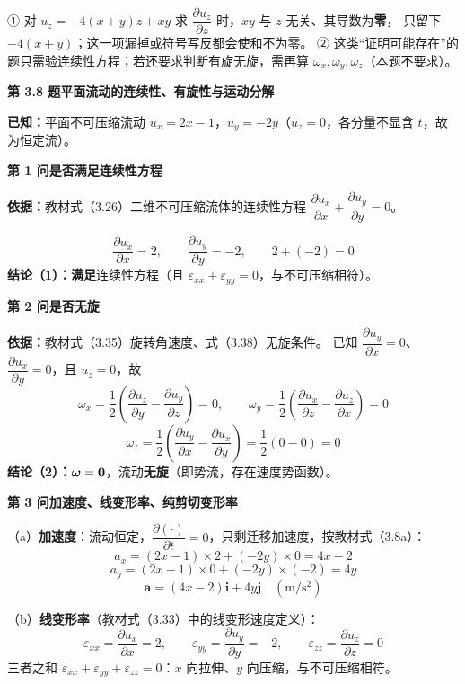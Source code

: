 \begin{yicuo}
① 对 $u_z=-4(x+y)z+xy$ 求 $\dfrac{\partial u_z}{\partial z}$ 时，$xy$ 与 $z$ 无关、其导数为\textbf{零}，
只留下 $-4(x+y)$；这一项漏掉或符号写反都会使和不为零。
② 这类“证明可能存在”的题只需验连续性方程；若还要求判断有旋无旋，需再算
$\omega_x,\omega_y,\omega_z$（本题不要求）。
\end{yicuo}

\noindent\textbf{第 3.8 题\quad 平面流动的连续性、有旋性与运动分解}

\begin{jie}
\textbf{已知：}平面不可压缩流动 $u_x=2x-1$，$u_y=-2y$（$u_z=0$，各分量不显含 $t$，故为恒定流）。

\textbf{第 1 问\quad 是否满足连续性方程}

\textbf{依据：}教材式（3.26）二维不可压缩流体的连续性方程
$\dfrac{\partial u_x}{\partial x}+\dfrac{\partial u_y}{\partial y}=0$。

\[ \frac{\partial u_x}{\partial x}=2,\qquad \frac{\partial u_y}{\partial y}=-2,\qquad 2+(-2)=0 \]
\textbf{结论（1）：}\textbf{满足}连续性方程（且 $\varepsilon_{xx}+\varepsilon_{yy}=0$，与不可压缩相符）。

\textbf{第 2 问\quad 是否无旋}

\textbf{依据：}教材式（3.35）旋转角速度、式（3.38）无旋条件。
已知 $\dfrac{\partial u_y}{\partial x}=0$、$\dfrac{\partial u_x}{\partial y}=0$，且 $u_z=0$，故
\[ \omega_x=\frac{1}{2}\left(\frac{\partial u_z}{\partial y}-\frac{\partial u_y}{\partial z}\right)=0,\qquad
   \omega_y=\frac{1}{2}\left(\frac{\partial u_x}{\partial z}-\frac{\partial u_z}{\partial x}\right)=0 \]
\[ \omega_z=\frac{1}{2}\left(\frac{\partial u_y}{\partial x}-\frac{\partial u_x}{\partial y}\right)
   =\frac{1}{2}(0-0)=0 \]
\textbf{结论（2）：}$\bm{\omega}=\bm{0}$，流动\textbf{无旋}（即势流，存在速度势函数）。

\textbf{第 3 问\quad 加速度、线变形率、纯剪切变形率}

（a）\textbf{加速度}：流动恒定，$\dfrac{\partial(\cdot)}{\partial t}=0$，只剩迁移加速度，按教材式（3.8a）：
\[ a_x=(2x-1)\times2+(-2y)\times0=4x-2 \]
\[ a_y=(2x-1)\times0+(-2y)\times(-2)=4y \]
\[ \bm a=(4x-2)\bm{i}+4y\bm{j}\quad(\mathrm{m/s^2}) \]

（b）\textbf{线变形率}（教材式（3.33）中的线变形速度定义）：
\[ \varepsilon_{xx}=\frac{\partial u_x}{\partial x}=2,\qquad
   \varepsilon_{yy}=\frac{\partial u_y}{\partial y}=-2,\qquad
   \varepsilon_{zz}=\frac{\partial u_z}{\partial z}=0 \]
三者之和 $\varepsilon_{xx}+\varepsilon_{yy}+\varepsilon_{zz}=0$：$x$ 向拉伸、$y$ 向压缩，与不可压缩相符。


\end{jie}
